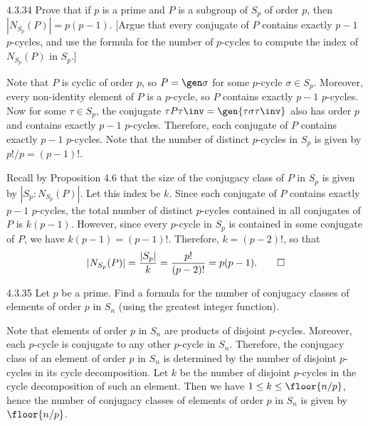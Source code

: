 \begin{exercise}{4.3.34}
	 Prove that if $p$ is a prime and $P$ is a subgroup of $S_p$ of order $p$, then $|N_{S_p}(P)| = p(p - 1)$. [Argue that every conjugate of $P$ contains exactly $p - 1$ $p$-cycles, and use the formula for the number of $p$-cycles to compute the index of $N_{S_p}(P)$ in $S_p$.]
\end{exercise}

\begin{sol}
	Note that $P$ is cyclic of order $p$, so $P = \gen\sigma$ for some $p$-cycle $\sigma \in S_p$.
	Moreover, every non-identity element of $P$ is a $p$-cycle, so $P$ contains exactly $p - 1$ $p$-cycles.
	Now for some $\tau \in S_p$, the conjugate $\tau P\tau\inv = \gen{\tau\sigma\tau\inv}$ also has order $p$ and contains exactly $p - 1$ $p$-cycles.
	Therefore, each conjugate of $P$ contains exactly $p - 1$ $p$-cycles.
	Note that the number of distinct $p$-cycles in $S_p$ is given by $p!/p = (p - 1)!$.

	Recall by Proposition 4.6 that the size of the conjugacy class of $P$ in $S_p$ is given by $|S_p : N_{S_p}(P)|$.
	Let this index be $k$.
	Since each conjugate of $P$ contains exactly $p - 1$ $p$-cycles, the total number of distinct $p$-cycles contained in all conjugates of $P$ is $k(p - 1)$.
	However, since every $p$-cycle in $S_p$ is contained in some conjugate of $P$, we have $k(p - 1) = (p - 1)!$.
	Therefore, $k = (p - 2)!$, so that
	\[
		|N_{S_p}(P)| = \frac{|S_p|}{k} = \frac{p!}{(p - 2)!} = p(p - 1).\qedhere
	\]
\end{sol}

\begin{exercise}{4.3.35}
	Let $p$ be a prime.
	Find a formula for the number of conjugacy classes of elements of order $p$ in $S_n$ (using the greatest integer function).
\end{exercise}

\begin{sol}
	Note that elements of order $p$ in $S_n$ are products of disjoint $p$-cycles.
	Moreover, each $p$-cycle is conjugate to any other $p$-cycle in $S_n$.
	Therefore, the conjugacy class of an element of order $p$ in $S_n$ is determined by the number of disjoint $p$-cycles in its cycle decomposition.
	Let $k$ be the number of disjoint $p$-cycles in the cycle decomposition of such an element.
	Then we have $1 \leq k \leq \floor{n/p}$, hence the number of conjugacy classes of elements of order $p$ in $S_n$ is given by $\floor{n/p}$.
\end{sol}

